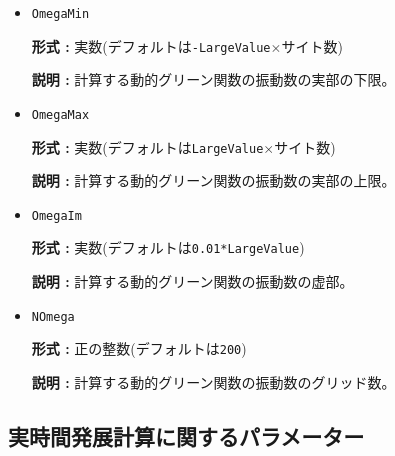 \begin{itemize}
\item \verb|OmegaMin|

  {\bf 形式 :} 実数(デフォルトは\verb|-LargeValue|$\times$サイト数)
  
  {\bf 説明 :} 計算する動的グリーン関数の振動数の実部の下限。
    
\item \verb|OmegaMax|

  {\bf 形式 :} 実数(デフォルトは\verb|LargeValue|$\times$サイト数)
  
  {\bf 説明 :} 計算する動的グリーン関数の振動数の実部の上限。

\item \verb|OmegaIm|

  {\bf 形式 :} 実数(デフォルトは\verb|0.01*LargeValue|)
  
  {\bf 説明 :} 計算する動的グリーン関数の振動数の虚部。

\item \verb|NOmega|
  
  {\bf 形式 :} 正の整数(デフォルトは\verb|200|)
    
  {\bf 説明 :} 計算する動的グリーン関数の振動数のグリッド数。

\end{itemize}

\subsection{実時間発展計算に関するパラメーター}

